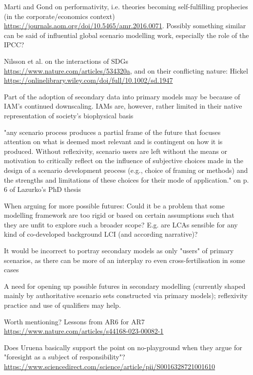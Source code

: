 \documentclass{article}
\begin{document}
Marti and Gond on performativity, i.e. theories becoming self-fulfilling prophecies (in the corporate/economics context) \url{https://journals.aom.org/doi/10.5465/amr.2016.0071}. Possibly something similar can be said of influential global scenario modelling work, especially the role of the IPCC?

Nilsson et al. on the interactions of SDGs \url{https://www.nature.com/articles/534320a}, and on their conflicting nature: Hickel \url{https://onlinelibrary.wiley.com/doi/full/10.1002/sd.1947}

Part of the adoption of secondary data into primary models may be because of IAM's continued downscaling. IAMs are, however, rather limited in their native representation of society's biophysical basis

"any scenario process produces a partial frame of the future that focuses attention on what is deemed most relevant and is contingent on how it is produced. Without reflexivity, scenario users are left without the means or motivation to critically reflect on the influence of subjective choices made in the design of a scenario development process (e.g., choice of framing or methods) and the strengths and limitations of these choices for their mode of application." on p. 6 of Lazurko's PhD thesis

When arguing for more possible futures: Could it be a problem that some modelling framework are too rigid or based on certain assumptions such that they are unfit to explore such a broader scope? E.g. are LCAs sensible for any kind of co-developed background LCI (and according narrative)?

It would be incorrect to portray secondary models as only "users" of primary scenarios, as there can be more of an interplay ro even cross-fertilisation in some cases

A need for opening up possible futures in secondary modelling (currently shaped mainly by authoritative scenario sets constructed via primary models); reflexivity practice and use of qualifiers may help.

Worth mentioning? Lessons from AR6 for AR7 \url{https://www.nature.com/articles/s44168-023-00082-1}

Does Uruena basically support the point on no-playground when they argue for "foresight as a subject of responsibility"? \url{https://www.sciencedirect.com/science/article/pii/S0016328721001610}
\end{document}
